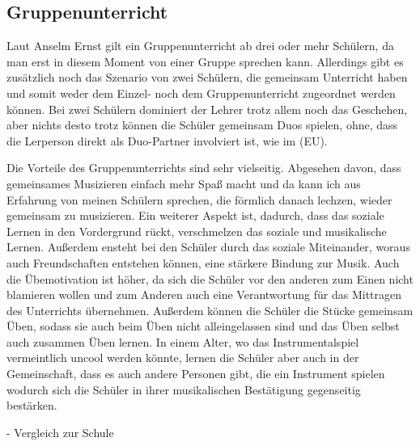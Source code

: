 \subsection{Gruppenunterricht} 
Laut Anselm Ernst gilt ein Gruppenunterricht ab drei oder mehr Schülern, da man
erst in diesem Moment von einer Gruppe sprechen kann.
\autocite[79]{ernst:die_zukunftsfaehige_musikschule}
Allerdings gibt es zusätzlich noch das Szenario von zwei Schülern, die gemeinsam
Unterricht haben und somit weder dem Einzel- noch dem Gruppenunterricht
zugeordnet werden können. Bei zwei Schülern dominiert der Lehrer trotz allem
noch das Geschehen, aber nichts desto trotz können die Schüler gemeinsam Duos
spielen, ohne, dass die Lerperson direkt als Duo-Partner involviert ist, wie im (EU).

Die Vorteile des Gruppenunterrichts sind sehr vielseitig. Abgesehen davon, dass
gemeinsames Musizieren einfach mehr Spaß macht und da kann ich aus Erfahrung von
meinen Schülern sprechen, die förmlich danach lechzen, wieder gemeinsam zu
musizieren. Ein weiterer Aspekt ist, dadurch, dass das soziale
Lernen in den Vordergrund rückt, verschmelzen das soziale und musikalische
Lernen. Außerdem ensteht bei den Schüler durch das soziale Miteinander, woraus
auch Freundschaften entstehen können, eine stärkere Bindung zur Musik. Auch die Übemotivation ist höher, da sich die Schüler vor den anderen
zum Einen nicht blamieren wollen und zum Anderen auch eine Verantwortung für das
Mittragen des Unterrichts übernehmen. Außerdem können die Schüler die Stücke
gemeinsam Üben, sodass sie auch beim Üben nicht alleingelassen sind und das Üben
selbst auch zusammen Üben lernen. In einem Alter, wo das Instrumentalspiel
vermeintlich uncool werden könnte, lernen die Schüler aber auch in der
Gemeinschaft, dass es auch andere Personen gibt, die ein Instrument spielen
wodurch sich die Schüler in ihrer musikalischen Bestätigung gegenseitig
bestärken. 

- Vergleich zur Schule


